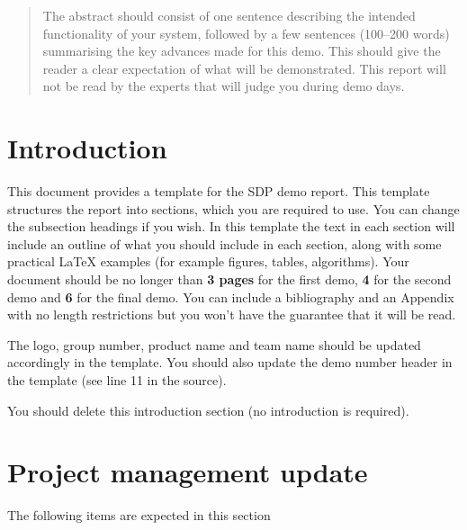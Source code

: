 \documentclass{article}
\begin{document}
 



\begin{abstract} 
The abstract should consist of one sentence describing the intended functionality of your system, followed by a few sentences (100--200 words) summarising the key advances made for this demo. This should give the reader a clear expectation of what will be demonstrated. This report will not be read by the experts that will judge you during demo days.
\end{abstract} 

\section*{Introduction}
\label{sec:intro}
This document provides a template for the SDP demo report.  This template structures the report into sections, which you are required to use. You can change the subsection headings if you wish. In this template the text in each section will include an outline of what you should include in each section, along with some practical LaTeX examples (for example figures, tables, algorithms).  Your document should be no longer than \textbf{3 pages} for the first demo, \textbf{4} for the second demo and \textbf{6} for the final demo. You can include a bibliography and an Appendix with no length restrictions but you won't have the guarantee that it will be read. 

The logo, group number, product name and team name should be updated accordingly in the template. You should also update the demo number header in the template (see line 11 in the source).

You should delete this introduction section (no introduction is required).

\section{Project management update} 

The following items are expected in this section
\end{document}
